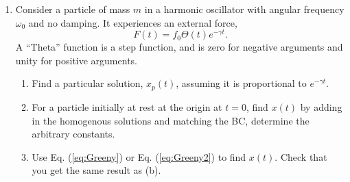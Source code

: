 \begin{enumerate}
\item Consider a particle of mass $m$ in a harmonic oscillator with angular frequency $\omega_0$ and no damping. It experiences an external force,
\[
F(t)=f_0\Theta(t)e^{-\gamma t}.
\]
A ``Theta'' function is a step function, and is zero for negative arguments and unity for positive arguments.
\begin{enumerate}
\item Find a particular solution, $x_p(t)$, assuming it is proportional to $e^{-\gamma t}$. 
\item For a particle initially at rest at the origin at $t=0$, find $x(t)$ by adding in the homogenous solutions and matching the BC, determine the arbitrary constants.
\item Use Eq. (\ref{eq:Greeny}) or Eq. (\ref{eq:Greeny2}) to find $x(t)$. Check that you get the same result as (b).
\end{enumerate}

\end{enumerate} 

